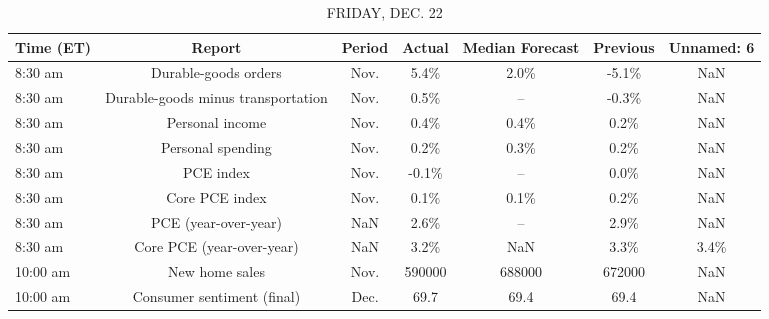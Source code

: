 \documentclass{article}%
\begin{document}
%


\begin{table}[htbp]%
\caption{FRIDAY, DEC. 22}%
\centering%
\begin{adjustbox}{width=1\textwidth}%
\begin{tabular}{lcccccc}
\toprule
Time (ET) &                             Report & Period & Actual & Median Forecast & Previous & Unnamed: 6 \\
\midrule
  8:30 am &               Durable-goods orders &   Nov. &   5.4\% &            2.0\% &    -5.1\% &        NaN \\
  8:30 am & Durable-goods minus transportation &   Nov. &   0.5\% &              -- &    -0.3\% &        NaN \\
  8:30 am &                    Personal income &   Nov. &   0.4\% &            0.4\% &     0.2\% &        NaN \\
  8:30 am &                  Personal spending &   Nov. &   0.2\% &            0.3\% &     0.2\% &        NaN \\
  8:30 am &                          PCE index &   Nov. &  -0.1\% &              -- &     0.0\% &        NaN \\
  8:30 am &                     Core PCE index &   Nov. &   0.1\% &            0.1\% &     0.2\% &        NaN \\
  8:30 am &               PCE (year-over-year) &    NaN &   2.6\% &              -- &     2.9\% &        NaN \\
  8:30 am &          Core PCE (year-over-year) &    NaN &   3.2\% &             NaN &     3.3\% &       3.4\% \\
 10:00 am &                     New home sales &   Nov. & 590000 &          688000 &   672000 &        NaN \\
 10:00 am &         Consumer sentiment (final) &   Dec. &   69.7 &            69.4 &     69.4 &        NaN \\
\bottomrule
\end{tabular}
%
\end{adjustbox}%
\end{table}
\end{document}
